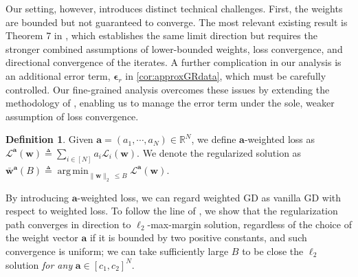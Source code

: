 \documentclass{article} %
\theoremstyle{plain}
\theoremstyle{definition}
\newtheorem{definition}[theorem]{Definition}
\theoremstyle{remark}
\newcommand{\Ls}{\mathcal{L}}
\newcommand{\R}{\mathbb{R}}
\DeclareMathOperator*{\argmin}{arg\,min}
\def\ba{{\boldsymbol a}}
\def\bw{{\mathbf w}}
\begin{document}
Our setting, however, introduces distinct technical challenges. First, the weights are bounded but not guaranteed to converge. The most relevant existing result is Theorem 7 in \citet{zhai2023understanding}, which establishes the same limit direction but requires the stronger combined assumptions of lower-bounded weights, loss convergence, and directional convergence of the iterates. A further complication in our analysis is an additional error term, $\boldsymbol{\epsilon}_r$ in \cref{cor:approxGRdata}, which must be carefully controlled. Our fine-grained analysis overcomes these issues by extending the methodology of \citet{ji2020regularization}, enabling us to manage the error term under the sole, weaker assumption of loss convergence.

\begin{definition}
    Given $\ba=(a_1, \cdots, a_N) \in \R^N$, we define $\ba$-weighted loss as $\Ls^\ba(\bw) \triangleq \sum_{i \in [N]}a_i\Ls_i(\bw)$. We denote the regularized solution as $\bar{\bw}^\ba(B) \triangleq \argmin_{\|\bw\|_2\ \leq B} \Ls^\ba(\bw)$.
\end{definition}

By introducing $\ba$-weighted loss, we can regard weighted GD as vanilla GD with respect to weighted loss. To follow the line of \citet{ji2020regularization}, we show that the regularization path converges in direction to $\ell_2$-max-margin solution, regardless of the choice of the weight vector $\ba$ if it is bounded by two positive constants, and such convergence is uniform; we can take sufficiently large $B$ to be close the $\ell_2$ solution \textit{for any} $\ba \in [c_1, c_2]^N$.
\end{document}
